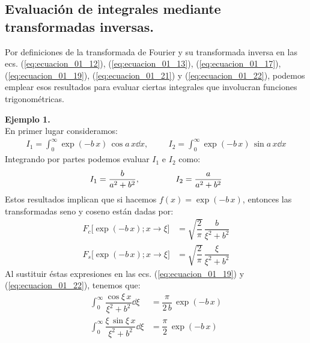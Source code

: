 \subsection{Evaluación de integrales mediante transformadas inversas.}

Por definiciones de la transformada de Fourier y su transformada inversa en las ecs. (\ref{eq:ecuacion_01_12}), (\ref{eq:ecuacion_01_13}), (\ref{eq:ecuacion_01_17}), (\ref{eq:ecuacion_01_19}), (\ref{eq:ecuacion_01_21}) y (\ref{eq:ecuacion_01_22}), podemos emplear esos resultados para evaluar ciertas integrales que involucran funciones trigonométricas. 
\bigskip

\noindent
\textbf{Ejemplo 1.}
\\
En primer lugar consideramos:
\begin{align*}
I_{1} = \int_{0}^{\infty} \exp (-b \, x) \, \cos a \, x \dd{x}, \hspace{1cm} I_{2} = \int_{0}^{\infty} \exp (-b \, x) \, \sin a \, x \dd{x}
\end{align*}
Integrando por partes podemos evaluar $I_{1}$ e $I_{2}$ como:
\begin{align*}
I_{1} = \dfrac{b}{a^{2} + b^{2}},  \hspace{1.5cm} I_{2} = \dfrac{a}{a^{2} + b^{2}}
\end{align*}
Estos resultados implican que si hacemos $f(x) = \exp(-b \, x)$, entonces las transformadas seno y coseno están dadas por:
\begin{align*}
F_{c} \big[\exp(-b \, x); x \to \xi \big] &= \sqrt{\dfrac{2}{\pi}} \, \dfrac{b}{\xi^{2} + b^{2}} \\[0.5em]
F_{s} \big[\exp(-b \, x); x \to \xi \big] &= \sqrt{\dfrac{2}{\pi}} \, \dfrac{\xi}{\xi^{2} + b^{2}}
\end{align*}
Al sustituir éstas expresiones en las ecs. (\ref{eq:ecuacion_01_19}) y (\ref{eq:ecuacion_01_22}), tenemos que:
\begin{align*}
\int_{0}^{\infty} \dfrac{\cos \xi \, x}{\xi^{2} + b^{2}} \dd{\xi} &= \dfrac{\pi}{2 \, b} \, \exp(-b \, x) \\[1em]
\int_{0}^{\infty} \dfrac{\xi \, \sin \xi \, x}{\xi^{2} + b^{2}} \dd{\xi} &= \dfrac{\pi}{2} \, \exp(-b \, x)
\end{align*}
\bigskip

